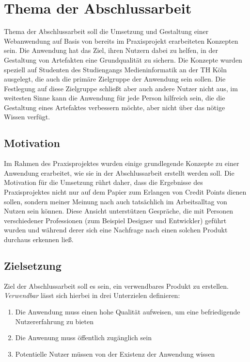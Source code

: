 \section{Thema der Abschlussarbeit}
Thema der Abschlussarbeit soll die Umsetzung und Gestaltung einer Webanwendung auf Basis von bereits im Praxisprojekt erarbeiteten Konzepten sein.
Die Anwendung hat das Ziel, ihren Nutzern dabei zu helfen, in der Gestaltung von Artefakten eine Grundqualität zu sichern. Die Konzepte wurden speziell auf Studenten des Studiengangs Medieninformatik an der TH Köln ausgelegt, die auch die primäre Zielgruppe der Anwendung sein sollen. Die Festlegung auf diese Zielgruppe schließt aber auch andere Nutzer nicht aus, im weitesten Sinne kann die Anwendung für jede Person hilfreich sein, die die Gestaltung eines Artefaktes verbessern möchte, aber nicht über das nötige Wissen verfügt.\\

\subsection{Motivation}
Im Rahmen des Praxisprojektes wurden einige grundlegende Konzepte zu einer Anwendung erarbeitet, wie sie in der Abschlussarbeit erstellt werden soll. Die Motivation für die Umsetzung rührt daher, dass die Ergebnisse des Praxisprojektes nicht nur auf dem Papier zum Erlangen von Credit Points dienen sollen, sondern meiner Meinung nach auch tatsächlich im Arbeitsalltag von Nutzen sein können. Diese Ansicht unterstützen Gespräche, die mit Personen verschiedener Professionen (zum Beispiel Designer und Entwickler) geführt wurden und während derer sich eine Nachfrage nach einen solchen Produkt durchaus erkennen ließ.

\subsection{Zielsetzung}
Ziel der Abschlussarbeit soll es sein, ein verwendbares Produkt zu erstellen. \textit{Verwendbar} lässt sich hierbei in drei Unterzielen definieren:

\begin{enumerate}
  \item Die Anwendung muss einen hohe Qualität aufweisen, um eine befriedigende Nutzererfahrung zu bieten
  \item Die Anwenung muss öffentlich zugänglich sein
  \item Potentielle Nutzer müssen von der Existenz der Anwendung wissen
\end{enumerate}

